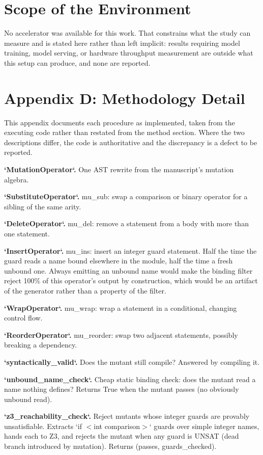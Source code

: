 \documentclass[10pt,twocolumn,letterpaper]{article}
\begin{document}
\section{Scope of the Environment}


No accelerator was available for this work. That constrains what the study can measure and is stated here rather than left implicit: results requiring model training, model serving, or hardware throughput measurement are outside what this setup can produce, and none are reported.




\section{Appendix D: Methodology Detail}


This appendix documents each procedure as implemented, taken from the executing code rather than restated from the method section. Where the two descriptions differ, the code is authoritative and the discrepancy is a defect to be reported.

\textbf{`MutationOperator`.} One AST rewrite from the manuscript's mutation algebra.

\textbf{`SubstituteOperator`.} mu\_sub: swap a comparison or binary operator for a sibling of the same arity.

\textbf{`DeleteOperator`.} mu\_del: remove a statement from a body with more than one statement.

\textbf{`InsertOperator`.} mu\_ins: insert an integer guard statement. Half the time the guard reads a name bound elsewhere in the module, half the time a fresh unbound one. Always emitting an unbound name would make the binding filter reject 100\% of this operator's output by construction, which would be an artifact of the generator rather than a property of the filter.

\textbf{`WrapOperator`.} mu\_wrap: wrap a statement in a conditional, changing control flow.

\textbf{`ReorderOperator`.} mu\_reorder: swap two adjacent statements, possibly breaking a dependency.

\textbf{`syntactically\_valid`.} Does the mutant still compile? Answered by compiling it.

\textbf{`unbound\_name\_check`.} Cheap static binding check: does the mutant read a name nothing defines? Returns True when the mutant passes (no obviously unbound read).

\textbf{`z3\_reachability\_check`.} Reject mutants whose integer guards are provably unsatisfiable. Extracts `if $<$int comparison$>$` guards over simple integer names, hands each to Z3, and rejects the mutant when any guard is UNSAT (dead branch introduced by mutation). Returns (passes, guards\_checked).
\end{document}
